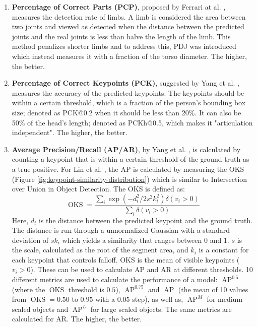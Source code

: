 \begin{enumerate}
	\item \textbf{Percentage of Correct Parts (PCP)}, proposed by Ferrari at al. \cite{Ferrari2008}, measures the detection rate of limbs.
	A limb is considered the area between two joints and viewed as detected when the distance between the predicted joints and the real joints is less than halve the length of the limb.
	This method penalizes shorter limbs and to address this, \gls{PDJ} was introduced which instead measures it with a fraction of the torso diameter.
	The higher, the better.
	\item \textbf{Percentage of Correct Keypoints (PCK)}, suggested by Yang et al. \cite{Yang2013}, measures the accuracy of the predicted keypoints.
	The keypoints should be within a certain threshold, which is a fraction of the person's bounding box size; denoted as PCK@0.2 when it should be less than 20\%.
	It can also be 50\% of the head's length; denoted as PCKh@0.5, which makes it "articulation independent".
	The higher, the better.
	\item \textbf{Average Precision/Recall (AP/AR)}, by Yang et al. \cite{Yang2013}, is calculated by counting a keypoint that is within a certain threshold of the ground truth as a true positive.
	For Lin et al. \cite{Lin2014}, the AP is calculated by measuring the \gls{OKS} (Figure \ref{fig:keypoint-similarity-distribution}) which is similar to Intersection over Union in Object Detection.
	The \gls{OKS} is defined as:
	\begin{equation}
		\operatorname{OKS} = \frac{\sum_{i}\exp(-d_i^2/2s^2k_i^2)\delta(v_i > 0)}{\sum_i \delta(v_i > 0)}
	\end{equation}
	Here, $d_i$ is the distance between the predicted keypoint and the ground truth.
	The distance is run through a unnormalized Gaussian with a standard deviation of $sk_i$ which yields a similarity that ranges between 0 and 1.
	$s$ is the scale, calculated as the root of the segment area, and $k_i$ is a constant for each keypoint that controls falloff.
	\gls{OKS} is the mean of visible keypoints ($v_i > 0$).
	These can be used to calculate \gls{AP} and \gls{AR} at different thresholds.
	10 different metrics are used to calculate the performance of a model:
	$\operatorname{AP}^{0.5}$ (where the $\operatorname{OKS}$ threshold is $0.5$), $\operatorname{AP}^{0.75}$ and $\operatorname{AP}$ (the mean of 10 values from $\operatorname{OKS}=0.50$ to $0.95$ with a $0.05$ step), as well as, $\operatorname{AP}^{M}$ for medium scaled objects and $\operatorname{AP}^{L}$ for large scaled objects.
	The same metrics are calculated for \gls{AR}.
	The higher, the better.
\end{enumerate}

